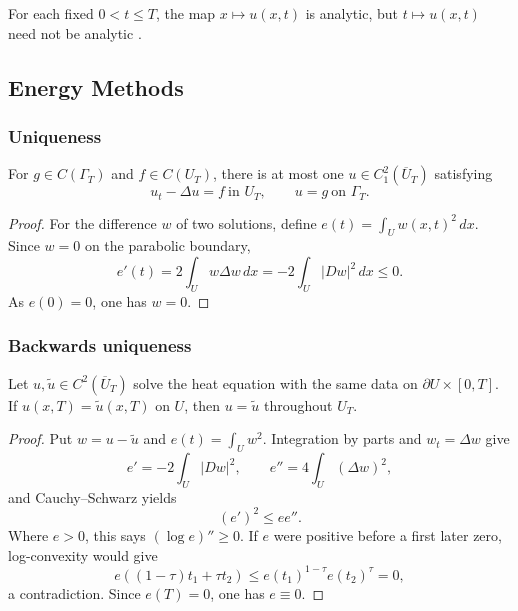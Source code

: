 \begin{remark}
\label{rem:heat-equation-spatial-analyticity}

For each fixed $0<t\le T$, the map $x\mapsto u(x,t)$ is analytic, but
$t\mapsto u(x,t)$ need not be analytic \cite{Mikhailov1978}.
\end{remark}

\subsection{Energy Methods}
\label{sec:heat-energy-methods}

\subsubsection{Uniqueness}
\label{sec:heat-energy-uniqueness}

\begin{theorem}
\label{thm:uniqueness-heat-energy-method}


For $g\in C(\Gamma_T)$ and $f\in C(U_T)$, there is at most one
$u\in C_1^2(\overline U_T)$ satisfying
$$u_t-\Delta u=f\ \text{in }U_T,
\qquad
u=g\ \text{on }\Gamma_T.$$
\end{theorem}
\begin{proof}
\sketch For the difference $w$ of two solutions, define
$e(t)=\int_Uw(x,t)^2\,dx$. Since $w=0$ on the parabolic boundary,
$$e'(t)=2\int_Uw\Delta w\,dx=-2\int_U|Dw|^2\,dx\le0.$$
As $e(0)=0$, one has $w=0$.
\end{proof}

\subsubsection{Backwards uniqueness}
\label{sec:heat-backwards-uniqueness}

\begin{theorem}
\label{thm:backwards-uniqueness-heat-equation}

Let $u,\widetilde u\in C^2(\overline U_T)$ solve the heat equation with the
same data on $\partial U\times[0,T]$. If $u(x,T)=\widetilde u(x,T)$ on $U$,
then $u=\widetilde u$ throughout $U_T$.
\end{theorem}
\begin{proof}
\sketch Put $w=u-\widetilde u$ and $e(t)=\int_Uw^2$. Integration by parts and
$w_t=\Delta w$ give
$$e'=-2\int_U|Dw|^2,
\qquad
e''=4\int_U(\Delta w)^2,$$
and Cauchy--Schwarz yields
$$(e')^2\le ee''.$$
Where $e>0$, this says $(\log e)''\ge0$. If $e$ were positive before a first
later zero, log-convexity would give
$$e((1-\tau)t_1+\tau t_2)
\le e(t_1)^{1-\tau}e(t_2)^\tau=0,$$
a contradiction. Since $e(T)=0$, one has $e\equiv0$.
\end{proof}

